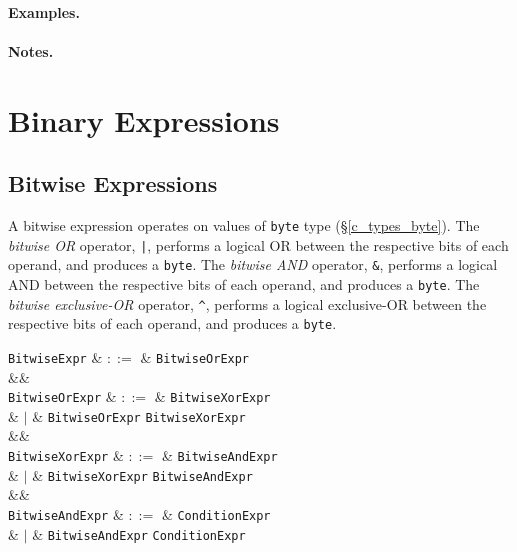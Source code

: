 \paragraph{Examples.}

\paragraph{Notes.} 


\section{Binary Expressions}


\subsection{Bitwise Expressions}
\label{c_expr_bitwise}
A bitwise expression operates on values of \lstinline{byte} type (\S\ref{c_types_byte}).  The {\em bitwise OR} operator, \lstinline{|}, performs a logical OR between the respective bits of each operand, and produces a \lstinline{byte}.  The {\em bitwise AND} operator, \lstinline{&}, performs a logical AND between the respective bits of each operand, and produces a \lstinline{byte}.   The {\em bitwise exclusive-OR} operator, \lstinline{^}, performs a logical exclusive-OR between the respective bits of each operand, and produces a \lstinline{byte}.

\begin{syntax}
  \verb+BitwiseExpr+ & $::=$ & \verb+BitwiseOrExpr+ \\
  &&\\
  \verb+BitwiseOrExpr+ & $::=$ & \verb+BitwiseXorExpr+ \\
                           & $|$ & \verb+BitwiseOrExpr+ \token{|} \verb+BitwiseXorExpr+\\
  &&\\
  \verb+BitwiseXorExpr+ & $::=$ & \verb+BitwiseAndExpr+ \\
                            & $|$ & \verb+BitwiseXorExpr+ \token{\^} \verb+BitwiseAndExpr+\\
  &&\\
  \verb+BitwiseAndExpr+ & $::=$ & \verb+ConditionExpr+ \\
                            & $|$ & \verb+BitwiseAndExpr+ \token{\&\&} \verb+ConditionExpr+\\

\end{syntax}

